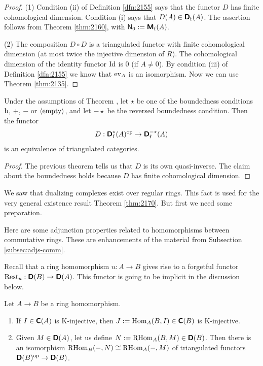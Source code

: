 \begin{proof}
(1) Condition (ii) of Definition \ref{dfn:2155} says that the functor $D$ has 
finite cohomological dimension. Condition (i) says that 
$D(A) \in \boldsymbol{\mathsf{D}}_{\mathrm{f}}(A)$.
The assertion follows from Theorem \ref{thm:2160}, with 
$\operatorname{\mathsf{N}}_0 := \boldsymbol{\mathsf{M}}_{\mathrm{f}}(A)$. 

\medskip \noindent
(2) The composition $D \circ D$ is a triangulated functor with finite 
cohomological dimension (at most twice the injective dimension of $R$). The 
cohomological dimension of the identity functor
$\operatorname{Id}$ is $0$ (if $A \neq 0$). 
By condition (iii) of Definition \ref{dfn:2155} we know that 
$\operatorname{ev}_A$ is an isomorphism. 
Now we can use Theorem \ref{thm:2135}. 
\end{proof}

\begin{cor} \label{cor:2155}
Under the assumptions of Theorem \tup{\ref{thm:2155}}, let 
$\star$ be one of the boundedness conditions $\mathrm{b}$, $+$, $-$ or 
$\langle \mathrm{empty} \rangle$, and let  $-\star$ be the reversed boundedness condition.
Then the functor 
\[ D : \boldsymbol{\mathsf{D}}^{\star}_{\mathrm{f}}(A)^{\mathrm{op}} \to 
\boldsymbol{\mathsf{D}}^{-\star}_{\mathrm{f}}(A) \]
is an equivalence of triangulated categories. 
\end{cor}

\begin{proof}
The previous theorem tells us that $D$ is its own quasi-inverse. The claim 
about the boundedness holds because $D$ has finite cohomological dimension.
\end{proof}

We saw that dualizing complexes exist over regular rings. This fact is used 
for the very general existence result Theorem \ref{thm:2170}. But first we need 
some preparation. 

Here are some adjunction properties related to homomorphisms between 
commutative rings. These are enhancements of the material from Subsection 
\ref{subsec:adjs-comm}.

Recall that a ring homomorphism $u : A \to B$ gives rise to a forgetful functor 
$\operatorname{Rest}_u : \boldsymbol{\mathsf{D}}(B) \to \boldsymbol{\mathsf{D}}(A)$.
This functor is going to be implicit in the discussion below. 

\begin{lem} \label{lem:2170}
Let $A \to B$ be a ring homomorphism. 
\begin{enumerate}
\item If $I \in \boldsymbol{\mathsf{C}}(A)$ is K-injective, then 
$J := \operatorname{Hom}_A(B, I) \in \boldsymbol{\mathsf{C}}(B)$ is K-injective. 

\item Given $M \in \boldsymbol{\mathsf{D}}(A)$, let us define 
$N := \operatorname{RHom}_A(B, M) \in \boldsymbol{\mathsf{D}}(B)$.
Then there is an isomorphism 
$\operatorname{RHom}_B(-, N) \cong \operatorname{RHom}_A(-, M)$
of triangulated functors
$\boldsymbol{\mathsf{D}}(B)^{\mathrm{op}} \to \boldsymbol{\mathsf{D}}(B)$.
\end{enumerate}
\end{lem}

